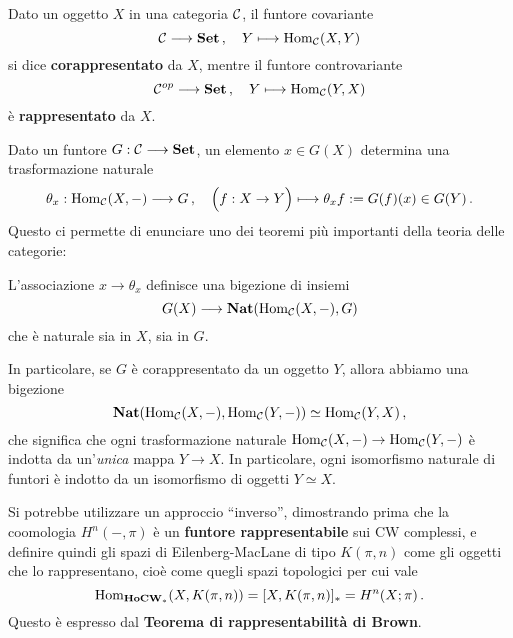 



\begin{df}
	Dato un oggetto $X$ in una categoria $\mathcal{C}$, il funtore covariante
	\begin{equation*}
		\mathcal{C} \longrightarrow {\normalfont\textbf{Set}}\,, \quad Y \longmapsto \operatorname{Hom}_{\mathcal{C}}(X,Y)
	\end{equation*}
	si dice \textbf{corappresentato} da $X$, mentre il funtore controvariante
	\begin{equation*}
		\mathcal{C}^{op} \longrightarrow {\normalfont\textbf{Set}}\,, \quad Y \longmapsto \operatorname{Hom}_{\mathcal{C}}(Y,X)
	\end{equation*}
	è \textbf{rappresentato} da $X$.
\end{df}

Dato un funtore $G:\mathcal{C} \longrightarrow {\normalfont\textbf{Set}}$,
un elemento $x \in G(X)$ determina una trasformazione naturale
\begin{equation*}
	\theta_{x}: \operatorname{Hom}_{\mathcal{C}}(X,-) \longrightarrow G\,,
	\quad \Big(f:X \to Y \Big) \longmapsto \theta_{x}f := G(f)(x) \in G(Y)\,.
\end{equation*}
Questo ci permette di enunciare uno dei teoremi più importanti
della teoria delle categorie:
\begin{thm}\label{yoneda-lemma}
	L'associazione $x \to \theta_{x}$ definisce una bigezione di insiemi
	\begin{equation*}
		G(X) \longrightarrow {\normalfont\textbf{Nat}}(\operatorname{Hom}_{\mathcal{C}}(X,-),G)
	\end{equation*}
	che è naturale sia in $X$, sia in $G$.
\end{thm}


In particolare, se $G$ è corappresentato da un oggetto $Y$,
allora abbiamo una bigezione
\begin{equation*}
	{\normalfont\textbf{Nat}}(\operatorname{Hom}_{\mathcal{C}}(X,-), \operatorname{Hom}_{\mathcal{C}}(Y,-)) \simeq \operatorname{Hom}_{\mathcal{C}}(Y,X)\,,
\end{equation*}
che significa che ogni trasformazione naturale $\operatorname{Hom}_{\mathcal{C}}(X,-) \to \operatorname{Hom}_{\mathcal{C}}(Y,-)$
è indotta da un'\emph{unica} mappa $Y \to X$.
In particolare, ogni isomorfismo naturale di funtori è indotto
da un isomorfismo di oggetti $Y \simeq X$.


\begin{fact}
Si potrebbe utilizzare un approccio ``inverso'',
dimostrando prima che la coomologia $H^{n}(-,\pi)$
è un \textbf{funtore rappresentabile} sui CW complessi,
e definire quindi gli spazi di Eilenberg-MacLane di tipo
$K(\pi,n)$ come gli oggetti che lo rappresentano,
cioè come quegli spazi topologici per cui vale
\begin{equation*}
	\operatorname{Hom}_{{\normalfont\textbf{HoCW}}_{\ast}}(X,K(\pi,n)) = [X,K(\pi,n)]_{\ast} = H^{n}(X;\pi)\,.
\end{equation*}
Questo è espresso dal \textbf{Teorema di rappresentabilità di Brown}.
\end{fact}


